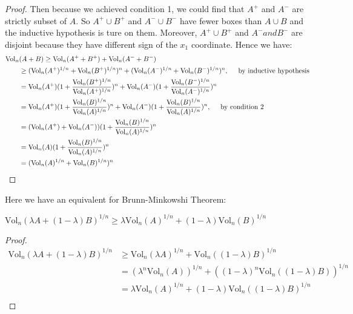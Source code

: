 \begin{proof}
  Then because we achieved condition 1, we could find that $A^+$ and $A^-$ are strictly subset of $A$. So $A^+\cup B^+$ and $A^- \cup B^-$ have fewer boxes than $A\cup B$ and the inductive hypothesis is ture on them. Moreover, $A^+\cup B^+$ and $A^- and B^-$ are disjoint because they have different sign of the $x_1$ coordinate. Hence we have:
  \begin{align*}
    \mathrm{Vol}_n&(A + B) \geq \mathrm{Vol}_n(A^+ + B^+) + \mathrm{Vol}_n(A^- + B^-) \\
    &\geq (\mathrm{Vol}_n(A^+)^{1/n} + \mathrm{Vol}_n(B^+)^{1/n})^n + (\mathrm{Vol}_n(A^-)^{1/n} + \mathrm{Vol}_n(B^-)^{1/n})^n, \hspace{0.5cm} \mbox{by inductive hypothesis}\\
    &= \mathrm{Vol}_n(A^+)(1 + \frac{\mathrm{Vol}_n(B^+)^{1/n}}{\mathrm{Vol}_n(A^+)^{1/n}})^n + \mathrm{Vol}_n(A^-)(1 + \frac{\mathrm{Vol}_n(B^-)^{1/n}}{\mathrm{Vol}_n(A^-)^{1/n}})^n \\
    &= \mathrm{Vol}_n(A^+)(1 + \frac{\mathrm{Vol}_n(B)^{1/n}}{\mathrm{Vol}_n(A)^{1/n}})^n + \mathrm{Vol}_n(A^-)(1 + \frac{\mathrm{Vol}_n(B)^{1/n}}{\mathrm{Vol}_n(A)^{1/n}})^n, \hspace{0.5cm} \mbox{by condition 2} \\
    &= (\mathrm{Vol}_n(A^+) + \mathrm{Vol}_n(A^-))(1 + \frac{\mathrm{Vol}_n(B)^{1/n}}{\mathrm{Vol}_n(A)^{1/n}})^n \\
    &= \mathrm{Vol}_n(A)(1 + \frac{\mathrm{Vol}_n(B)^{1/n}}{\mathrm{Vol}_n(A)^{1/n}})^n \\
    &= (\mathrm{Vol}_n(A)^{1/n} + \mathrm{Vol}_n(B)^{1/n})^n \qedhere
  \end{align*}
\end{proof}

Here we have an equivalent for Brunn-Minkowshi Theorem:
\begin{corollary}
  $\mathrm{Vol}_n (\lambda A + (1-\lambda) B)^{1/n} \geq \lambda\mathrm{Vol}_n(A)^{1/n} + (1-\lambda)\mathrm{Vol}_n (B)^{1/n}$
\end{corollary}
\begin{proof}
  \begin{align*}
    \mathrm{Vol}_n(\lambda A + (1-\lambda)B)^{1/n} &\geq \mathrm{Vol}_n(\lambda A)^{1/n} + \mathrm{Vol}_n((1-\lambda)B)^{1/n} \\
    &= (\lambda^n\mathrm{Vol}_n(A))^{1/n} + ((1-\lambda)^n\mathrm{Vol}_n((1-\lambda)B))^{1/n} \\
    &= \lambda\mathrm{Vol}_n(A)^{1/n} + (1-\lambda)\mathrm{Vol}_n((1-\lambda)B)^{1/n} \\
  \end{align*}
\end{proof}

